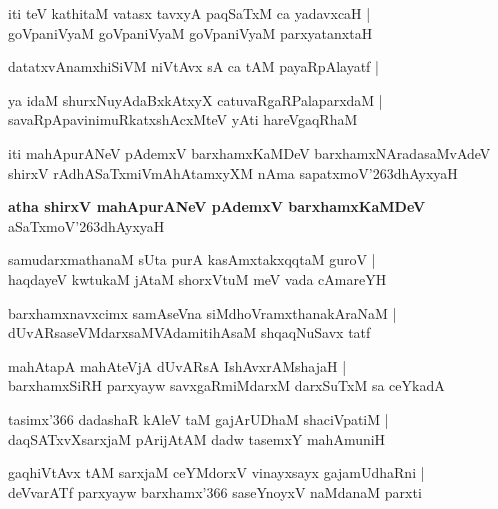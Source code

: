 \begin{shloka}
iti teV kathitaM vatasx tavxyA paqSaTxM ca yadavxcaH |\\
goVpaniVyaM goVpaniVyaM goVpaniVyaM parxyatanxtaH
\end{shloka}
datatxvAnamxhiSiVM niVtAvx sA ca tAM payaRpAlayatf |

\begin{shloka}
ya idaM shurxNuyAdaBxkAtxyX catuvaRgaRPalaparxdaM |\\
savaRpApavinimuRkatxshAcxMteV yAti hareVgaqRhaM
\end{shloka}
iti mahApurANeV pAdemxV barxhamxKaMDeV barxhamxNAradasaMvAdeV shirxV rAdhASaTxmiVmAhAtamxyXM nAma sapatxmoV\char'263dhAyxyaH

\begin{center}
\textbf{\large atha shirxV mahApurANeV pAdemxV barxhamxKaMDeV}\\
aSaTxmoV\char'263dhAyxyaH
\end{center}

\setcounter{shloka}{0}
\begin{shloka}
samudarxmathanaM sUta purA kasAmxtakxqqtaM guroV |\\
haqdayeV kwtukaM jAtaM shorxVtuM meV vada cAmareYH
\end{shloka}

\begin{shloka}
barxhamxnavxcimx samAseVna siMdhoVramxthanakAraNaM |\\
dUvARsaseVMdarxsaMVAdamitihAsaM shqaqNuSavx tatf
\end{shloka}

\begin{shloka}
mahAtapA mahAteVjA dUvARsA IshAvxrAMshajaH |\\
barxhamxSiRH parxyayw savxgaRmiMdarxM darxSuTxM sa ceYkadA
\end{shloka}

\begin{shloka}
tasimx\char'366 dadashaR kAleV taM gajArUDhaM shaciVpatiM |\\
daqSATxvXsarxjaM pArijAtAM dadw tasemxY mahAmuniH
\end{shloka}

\begin{shloka}
gaqhiVtAvx tAM sarxjaM ceYMdorxV vinayxsayx gajamUdhaRni |\\
deVvarATf parxyayw barxhamx\char'366 saseYnoyxV naMdanaM parxti
\end{shloka}

